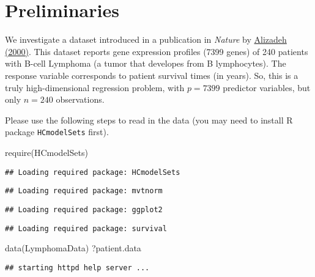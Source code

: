 \documentclass[
]{article}
\newenvironment{Shaded}{\begin{snugshade}}{\end{snugshade}}
\newcommand{\FunctionTok}[1]{\textcolor[rgb]{0.00,0.00,0.00}{#1}}
\newcommand{\NormalTok}[1]{#1}
\begin{document}
\hypertarget{preliminaries}{%
\section{Preliminaries}\label{preliminaries}}

We investigate a dataset introduced in a publication in \emph{Nature} by
\href{https://www.researchgate.net/publication/12638392_Distinct_types_of_diffuse_large_B-cell_lymphoma_identified_by_gene_expression_profiling}{Alizadeh
(2000)}. This dataset reports gene expression profiles (7399 genes) of
240 patients with B-cell Lymphoma (a tumor that developes from B
lymphocytes). The response variable corresponds to patient survival
times (in years). So, this is a truly high-dimensional regression
problem, with \(p=7399\) predictor variables, but only \(n=240\)
observations.

Please use the following steps to read in the data (you may need to
install R package \texttt{HCmodelSets} first).

\begin{Shaded}
\begin{Highlighting}[]
\FunctionTok{require}\NormalTok{(HCmodelSets)}
\end{Highlighting}
\end{Shaded}

\begin{verbatim}
## Loading required package: HCmodelSets
\end{verbatim}

\begin{verbatim}
## Loading required package: mvtnorm
\end{verbatim}

\begin{verbatim}
## Loading required package: ggplot2
\end{verbatim}

\begin{verbatim}
## Loading required package: survival
\end{verbatim}

\begin{Shaded}
\begin{Highlighting}[]
\FunctionTok{data}\NormalTok{(LymphomaData)}
\NormalTok{?patient.data}
\end{Highlighting}
\end{Shaded}

\begin{verbatim}
## starting httpd help server ...
\end{verbatim}
\end{document}
